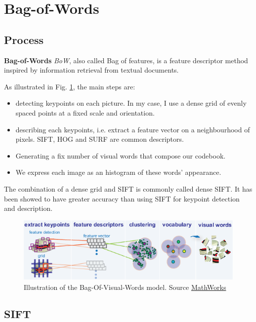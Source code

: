 \section{Bag-of-Words}
\subsection{Process}

\textbf{Bag-of-Words} \textit{BoW}, also called Bag of features, is a feature descriptor method inspired by information retrieval from textual documents.

As illustrated in Fig. \ref{fig:bow_process}, the main steps are:
\begin{itemize}
    \item detecting keypoints on each picture. In my case, I use a dense grid of evenly spaced points at a fixed scale and orientation.
    \item describing each keypoints, i.e. extract a feature vector on a neighbourhood of pixels. SIFT, HOG and SURF are common descriptors.
    \item Generating a fix number of visual words that compose our codebook.
    \item We express each image as an histogram of these words' appearance.
\end{itemize}

The combination of a dense grid and SIFT is commonly called dense SIFT. It has been showed to have greater accuracy than using SIFT for keypoint detection and description.

\begin{figure}
    \centering
    \includegraphics[scale=0.9]{img/bow.png}
    \caption[Illustration of the Bag-Of-Visual-Words model]{Illustration of the Bag-Of-Visual-Words model. Source \href{http://uk.mathworks.com/help/vision/ug/image-classification-with-bag-of-visual-words.html}{MathWorks}}
    \label{fig:bow_process}
\end{figure}

\subsection{SIFT}

